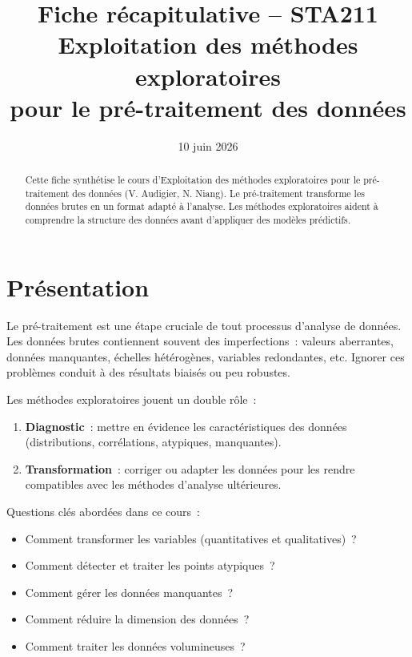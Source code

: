 \documentclass[a4paper,11pt]{article}
\title{\textbf{Fiche récapitulative -- STA211}\\[4pt]
\large Exploitation des méthodes exploratoires\\pour le pré-traitement des données}
\author{}
\date{10 juin 2026}
\theoremstyle{definition}
\theoremstyle{remark}
\begin{document}
\maketitle
\thispagestyle{empty}

\begin{abstract}
Cette fiche synthétise le cours d'Exploitation des méthodes exploratoires pour le
pré-traitement des données (V. Audigier, N. Niang). Le pré-traitement transforme
les données brutes en un format adapté à l'analyse. Les méthodes exploratoires
aident à comprendre la structure des données avant d'appliquer des modèles
prédictifs.
\end{abstract}

\vfill
\tableofcontents
\newpage

\section{Présentation}

Le pré-traitement est une étape cruciale de tout processus d'analyse de données.
Les données brutes contiennent souvent des imperfections~: valeurs aberrantes,
données manquantes, échelles hétérogènes, variables redondantes, etc. Ignorer
ces problèmes conduit à des résultats biaisés ou peu robustes.

Les méthodes exploratoires jouent un double rôle~:
\begin{enumerate}
  \item \textbf{Diagnostic}~: mettre en évidence les caractéristiques des données
    (distributions, corrélations, atypiques, manquantes).
  \item \textbf{Transformation}~: corriger ou adapter les données pour les rendre
    compatibles avec les méthodes d'analyse ultérieures.
\end{enumerate}

Questions clés abordées dans ce cours~:
\begin{itemize}
  \item Comment transformer les variables (quantitatives et qualitatives)~?
  \item Comment détecter et traiter les points atypiques~?
  \item Comment gérer les données manquantes~?
  \item Comment réduire la dimension des données~?
  \item Comment traiter les données volumineuses~?
\end{itemize}
\end{document}
